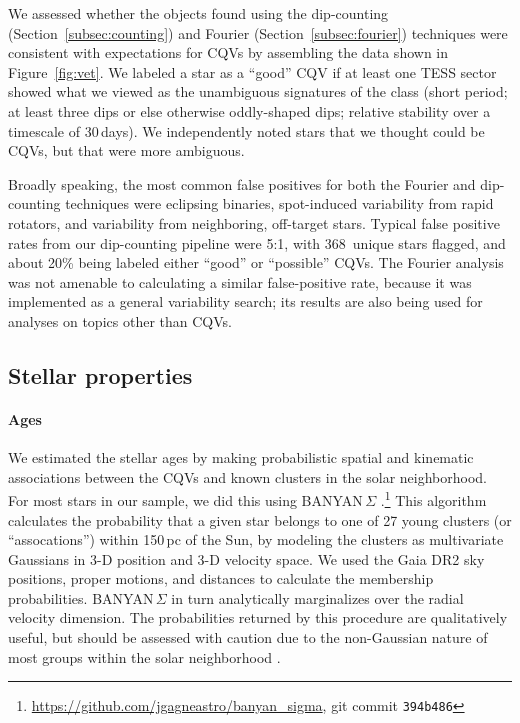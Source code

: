 \documentclass[11pt,twocolumn,tighten]{aastex63}
\newcommand{\nuniqdipflagged}{{368}} %
\begin{document}
We assessed whether the objects found using the dip-counting
(Section~\ref{subsec:counting}) and Fourier
(Section~\ref{subsec:fourier}) techniques were consistent with
expectations for CQVs by assembling the data shown in
Figure~\ref{fig:vet}.  We labeled a star as a ``good'' CQV if at least
one TESS sector showed what we viewed as the unambiguous signatures of
the class (short period; at least three dips or else otherwise
oddly-shaped dips; relative stability over a timescale of 30\,days).
We independently noted stars that we thought could be CQVs, but that
were more ambiguous.

Broadly speaking, the most common false positives for both the Fourier
and dip-counting techniques were eclipsing binaries, spot-induced
variability from rapid rotators, and variability from neighboring,
off-target stars.  Typical false positive rates from our dip-counting
pipeline were 5:1, with \nuniqdipflagged\ unique stars flagged, and
about 20\% being labeled either ``good'' or ``possible'' CQVs.  The
Fourier analysis was not amenable to calculating a similar
false-positive rate, because it was implemented as a general
variability search; its results are also being used for analyses on
topics other than CQVs.


\subsection{Stellar properties}
\label{subsec:starprops}

\paragraph{Ages}
We estimated the stellar ages by making probabilistic spatial and
kinematic associations between the CQVs and known clusters in the
solar neighborhood.  For most stars in our sample, we did this using
BANYAN\,$\Sigma$
\citep{2018ApJ...856...23G}.\footnote{\url{https://github.com/jgagneastro/banyan_sigma},
git commit \texttt{394b486}} This algorithm calculates the probability
that a given star belongs to one of 27 young clusters (or
``assocations'') within 150\,pc of the Sun, by modeling the clusters
as multivariate Gaussians in 3-D position and 3-D velocity space.  We
used the Gaia DR2 sky positions, proper motions, and distances to
calculate the membership probabilities.  BANYAN\,$\Sigma$ in turn
analytically marginalizes over the radial velocity dimension.  The
probabilities returned by this procedure are qualitatively useful, but
should be assessed with caution due to the non-Gaussian nature of most
groups within the solar neighborhood \citep[see
e.g.][Figure~10]{2021ApJ...917...23K}.
\end{document}
